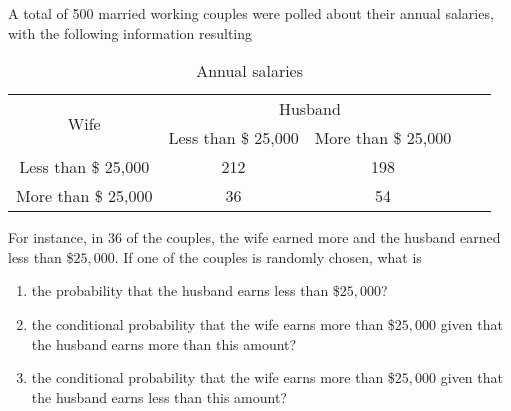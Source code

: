 \documentclass{article}[12pt]
\newenvironment{problem}[1]
  {\renewcommand\theinnercustomprblm{#1}\innercustomprblm}
  {\endinnercustomprblm}
\begin{document}
\begin{problem}{3.21}\normalfont
A total of 500 married working couples were polled about their annual salaries, with the following information resulting
\begin{table}[ph]
  \centering
  \begin{tabular}{c|c|c|c|c}
    \hline
    \multirow{2}{*}{Wife} & \multicolumn{2}{c}{Husband} \\
    \hhline{~--}
    & Less than \$ 25,000 & More than \$ 25,000 \\
    \hline
    Less than \$ 25,000 & 212 & 198 \\
    \hline
    More than \$ 25,000 & 36 & 54 \\
    \hline
  \end{tabular}
  \caption{Annual salaries}
  \label{T:peak}
\end{table}
For instance, in $36$ of the couples, the wife earned more and the husband earned less than \$$25,000$.
If one of the couples is randomly chosen, what is
\begin{enumerate}[label=(\alph*)]
    \item the probability that the husband earns less than \$$25,000$?
    \item the conditional probability that the wife earns more than \$$25,000$ given that the husband earns more than this amount?
    \item the conditional probability that the wife earns more than \$$25,000$ given that the husband earns less than this amount?
\end{enumerate}
\end{problem}
\end{document}
